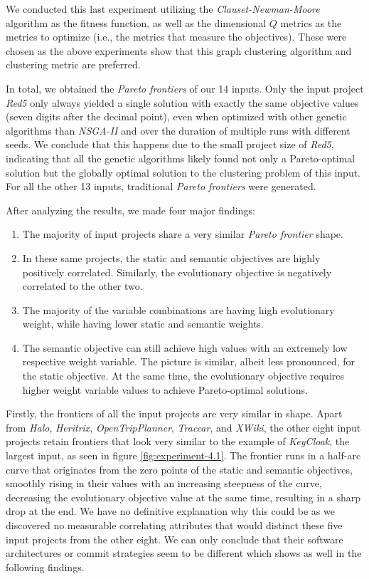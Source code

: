 \documentclass[12pt,a4paper]{report}
\begin{document}
We conducted this last experiment utilizing the \textit{Clauset-Newman-Moore}
algorithm as the fitness function, as well as the dimensional $Q$ metrics
as the metrics to optimize (i.e., the metrics that measure the objectives).
These were chosen as the above experiments show that this graph clustering
algorithm and clustering metric are preferred.

In total, we obtained the \textit{Pareto frontiers} of our 14 inputs.
Only the input project \textit{Red5} only always yielded a single solution
with exactly the same objective values (seven digits after the decimal point),
even when optimized with other genetic algorithms than \textit{NSGA-II} and
over the duration of multiple runs with different seeds.
We conclude that this happens due to the small project
size of \textit{Red5}, indicating that all the genetic algorithms
likely found not only a Pareto\hyp optimal solution but the globally optimal
solution to the clustering problem of this input.
For all the other 13 inputs, traditional \textit{Pareto frontiers} were
generated.

After analyzing the results, we made four major findings:
\begin{enumerate}
  \item The majority of input projects share a very similar \textit{Pareto frontier} shape.
  \item In these same projects, the static and semantic objectives are highly positively correlated.
        Similarly, the evolutionary objective is negatively correlated to the other two.
  \item The majority of the variable combinations are having high evolutionary weight, while having lower static and semantic weights.
  \item The semantic objective can still achieve high values with an extremely low respective weight variable.
        The picture is similar, albeit less pronounced, for the static objective.
        At the same time, the evolutionary objective requires higher weight variable values to achieve Pareto\hyp optimal solutions.
\end{enumerate}

Firstly, the frontiers of all the input projects are very similar in shape.
Apart from \textit{Halo}, \textit{Heritrix}, \textit{OpenTripPlanner},
\textit{Traccar}, and \textit{XWiki}, the other eight input projects retain
frontiers that look very similar to the example of \textit{KeyCloak},
the largest input, as seen in figure \ref{fig:experiment-4.1}.
The frontier runs in a half\hyp arc curve that originates from the zero points
of the static and semantic objectives, smoothly rising in their values with
an increasing steepness of the curve, decreasing the evolutionary objective
value at the same time, resulting in a sharp drop at the end.
We have no definitive explanation why this could be as we discovered no
measurable correlating attributes that would distinct these five input projects
from the other eight. We can only conclude that their software architectures
or commit strategies seem to be different which shows as well in the following
findings.
\end{document}
